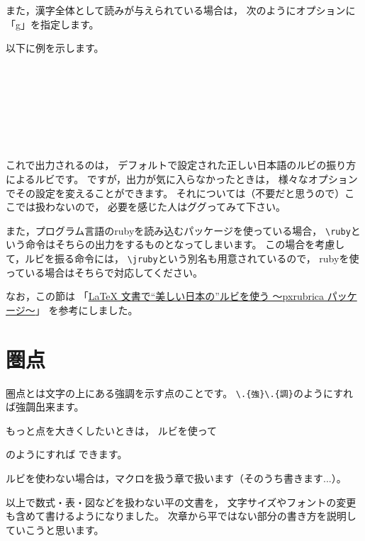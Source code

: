 また，漢字全体として読みが与えられている場合は，
次のようにオプションに「g」を指定します。
\begin{ITeX}
\end{ITeX}

以下に例を示します。

\begin{IOTeX}
 \\

 \\

 \\

 \\

 \\

 \\

\end{IOTeX}


これで出力されるのは，
デフォルトで設定された正しい日本語のルビの振り方によるルビです。
ですが，出力が気に入らなかったときは，
様々なオプションでその設定を変えることができます。
それについては（不要だと思うので）ここでは扱わないので，
必要を感じた人はググってみて下さい。

また，プログラム言語のrubyを読み込むパッケージを使っている場合，
\verb|\ruby|という命令はそちらの出力をするものとなってしまいます。
この場合を考慮して，ルビを振る命令には，
\verb|\jruby|という別名も用意されているので，
rubyを使っている場合はそちらで対応してください。

なお，この節は
「\href{http://qiita.com/zr_tex8r/items/42466cbcbeb670a3a2dc}{LaTeX 文書で“美しい日本の”ルビを使う ～pxrubrica パッケージ～}」
を参考にしました。



\section{圏点}
圏点とは文字の上にある強調を示す点のことです。
\verb|\.{強}\.{調}|のようにすれば\.{強}\.{調}出来ます。

もっと点を大きくしたいときは，
ルビを使って
\begin{ITeX}
\end{ITeX}
のようにすれば できます。

ルビを使わない場合は，マクロを扱う章で扱います（そのうち書きます...）。

\vspace{2\baselineskip}

以上で数式・表・図などを扱わない平の文書を，
文字サイズやフォントの変更も含めて書けるようになりました。
次章から平ではない部分の書き方を説明していこうと思います。

